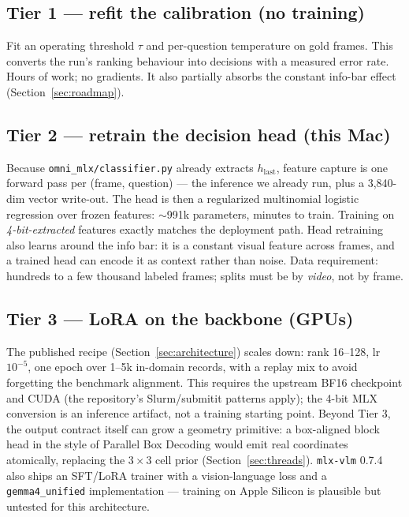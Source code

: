 \documentclass[11pt]{article}
\newcommand{\code}[1]{\texttt{#1}}
\newcommand{\pkg}[1]{\texttt{#1}}
\begin{document}
\subsection{Tier 1 --- refit the calibration (no training)}

Fit an operating threshold $\tau$ and per-question temperature on gold frames.
This converts the run's ranking behaviour into decisions with a measured error
rate. Hours of work; no gradients. It also partially absorbs the constant
info-bar effect (Section~\ref{sec:roadmap}).

\subsection{Tier 2 --- retrain the decision head (this Mac)}

Because \code{omni\_mlx/classifier.py} already extracts $h_{\text{last}}$,
feature capture is one forward pass per (frame, question) --- the inference we
already run, plus a 3{,}840-dim vector write-out. The head is then a
regularized multinomial logistic regression over frozen features:
$\sim$991k parameters, minutes to train. Training on \emph{4-bit-extracted}
features exactly matches the deployment path. Head retraining also learns
around the info bar: it is a constant visual feature across frames, and a
trained head can encode it as context rather than noise. Data requirement:
hundreds to a few thousand labeled frames; splits must be by \emph{video}, not
by frame.

\subsection{Tier 3 --- LoRA on the backbone (GPUs)}

The published recipe (Section~\ref{sec:architecture}) scales down: rank
16--128, lr $10^{-5}$, one epoch over 1--5k in-domain records, with a replay
mix to avoid forgetting the benchmark alignment. This requires the upstream
BF16 checkpoint and CUDA (the repository's Slurm/submitit patterns apply); the
4-bit MLX conversion is an inference artifact, not a training starting point.
Beyond Tier 3, the output contract itself can grow a geometry primitive: a
box-aligned block head in the style of Parallel Box Decoding
\cite{locateanything2026} would emit real coordinates atomically, replacing
the $3\times3$ cell prior (Section~\ref{sec:threads}).
\pkg{mlx-vlm} 0.7.4 also ships an SFT/LoRA trainer with a vision-language loss
and a \code{gemma4\_unified} implementation --- training on Apple Silicon is
plausible but untested for this architecture.
\end{document}
